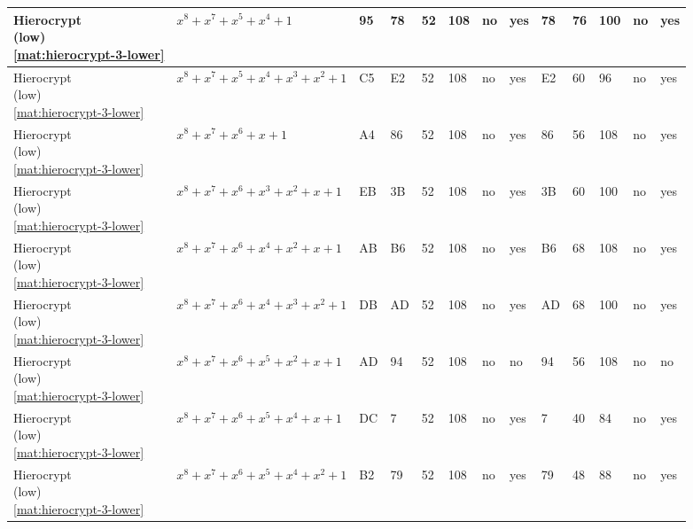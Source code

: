 \begin{tiny}
\begin{longtable}{|l|l|l|l|l|l|l|l|l|l|l|l|l|}
\shortstack{Hierocrypt \\ (low) \\ \eqref{mat:hierocrypt-3-lower}} & $x^8 + x^7 + x^5 + x^4 + 1$ & 95 & 78 & 52 & 108 & no & yes & 78 & 76 & 100 & no & yes \\ \hline
\shortstack{Hierocrypt \\ (low) \\ \eqref{mat:hierocrypt-3-lower}} & $x^8 + x^7 + x^5 + x^4 + x^3 + x^2 + 1$ & C5 & E2 & 52 & 108 & no & yes & E2 & 60 & 96 & no & yes \\ \hline
\shortstack{Hierocrypt \\ (low) \\ \eqref{mat:hierocrypt-3-lower}} & $x^8 + x^7 + x^6 + x + 1$ & A4 & 86 & 52 & 108 & no & yes & 86 & 56 & 108 & no & yes \\ \hline
\shortstack{Hierocrypt \\ (low) \\ \eqref{mat:hierocrypt-3-lower}} & $x^8 + x^7 + x^6 + x^3 + x^2 + x + 1$ & EB & 3B & 52 & 108 & no & yes & 3B & 60 & 100 & no & yes \\ \hline
\shortstack{Hierocrypt \\ (low) \\ \eqref{mat:hierocrypt-3-lower}} & $x^8 + x^7 + x^6 + x^4 + x^2 + x + 1$ & AB & B6 & 52 & 108 & no & yes & B6 & 68 & 108 & no & yes \\ \hline
\shortstack{Hierocrypt \\ (low) \\ \eqref{mat:hierocrypt-3-lower}} & $x^8 + x^7 + x^6 + x^4 + x^3 + x^2 + 1$ & DB & AD & 52 & 108 & no & yes & AD & 68 & 100 & no & yes \\ \hline
\shortstack{Hierocrypt \\ (low) \\ \eqref{mat:hierocrypt-3-lower}} & $x^8 + x^7 + x^6 + x^5 + x^2 + x + 1$ & AD & 94 & 52 & 108 & no & no & 94 & 56 & 108 & no & no \\ \hline
\shortstack{Hierocrypt \\ (low) \\ \eqref{mat:hierocrypt-3-lower}} & $x^8 + x^7 + x^6 + x^5 + x^4 + x + 1$ & DC & 7 & 52 & 108 & no & yes & 7 & 40 & 84 & no & yes \\ \hline
\shortstack{Hierocrypt \\ (low) \\ \eqref{mat:hierocrypt-3-lower}} & $x^8 + x^7 + x^6 + x^5 + x^4 + x^2 + 1$ & B2 & 79 & 52 & 108 & no & yes & 79 & 48 & 88 & no & yes \\ \hline

\end{longtable}
\end{tiny}

